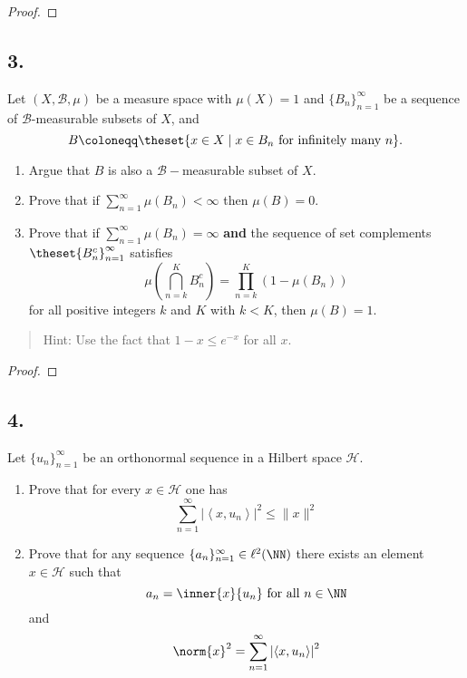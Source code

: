 \begin{proof}

\end{proof}

\hypertarget{section-2}{%
\subsection{3.}\label{section-2}}

Let \(( X, \mathcal B, \mu )\) be a measure space with \(\mu(X) = 1\) and
\(\{B_n\}_{n=1}^\infty\) be a sequence of \(\mathcal B\)-measurable
subsets of \(X\), and \[
B \coloneqq \theset{x\in X \mid x\in B_n \text{ for infinitely many } n}.
\]

\begin{enumerate}
\def\labelenumi{\alph{enumi}.}
\item
  Argue that \(B\) is also a \(\mathcal{B} -\)measurable subset of
  \(X\).
\item
  Prove that if \(\sum_{n=1}^\infty \mu(B_n) < \infty\) then
  \(\mu(B)= 0\).
\item
  Prove that if \(\sum_{n=1}^\infty \mu(B_n) = \infty\) \textbf{and} the
  sequence of set complements \(\theset{B_n^c}_{n=1}^\infty\) satisfies
  \[
  \mu\left(\bigcap_{n=k}^{K} B_{n}^{c}\right)=\prod_{n=k}^{K}\left(1-\mu\left(B_{n}\right)\right)
  \] for all positive integers \(k\) and \(K\) with \(k < K\), then
  \(\mu(B) = 1\).
\end{enumerate}

\begin{quote}
Hint: Use the fact that \(1 - x \leq e^{-x}\) for all \(x\).
\end{quote}

\begin{proof}

\end{proof}

\hypertarget{section-3}{%
\subsection{4.}\label{section-3}}

Let \(\{u_n\}_{n=1}^\infty\) be an orthonormal sequence in a Hilbert space
\(\mathcal{H}\).

\begin{enumerate}
\def\labelenumi{\alph{enumi}.}
\item
  Prove that for every \(x \in \mathcal H\) one has \[
  \displaystyle\sum_{n=1}^{\infty}\left|\left\langle x, u_{n}\right\rangle\right|^{2} \leq\|x\|^{2}
  \]
\item
  Prove that for any sequence \(\{a_n\}_{n=1}^\infty \in \ell^2(\NN)\)
  there exists an element \(x\in\mathcal H\) such that \[
    a_n = \inner{x}{u_n} \text{ for all } n\in \NN
    \] and \[
    \norm{x}^2 = \sum_{n=1}^{\infty}\left|\left\langle x, u_{n}\right\rangle\right|^{2}
    \]
\end{enumerate}

